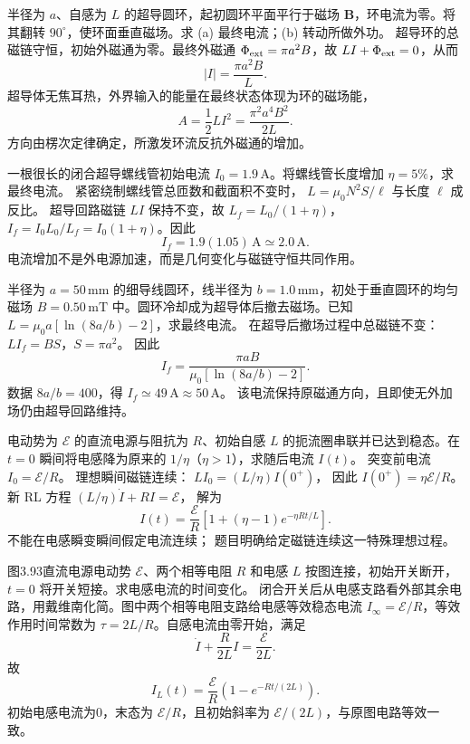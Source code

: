 半径为 $a$、自感为 $L$ 的超导圆环，起初圆环平面平行于磁场 $\bm B$，环电流为零。将其翻转 $90^\circ$，使环面垂直磁场。求 (a) 最终电流；(b) 转动所做外功。
\exsolution
超导环的总磁链守恒，初始外磁通为零。最终外磁通 $\Phi_{\rm ext}=\pi a^2B$，故
$LI+\Phi_{\rm ext}=0$，从而
\[
\boxed{|I|=\frac{\pi a^2B}{L}}.
\]
超导体无焦耳热，外界输入的能量在最终状态体现为环的磁场能，
\[
\boxed{A=\frac12LI^2=\frac{\pi^2a^4B^2}{2L}}.
\]
\excheck 方向由楞次定律确定，所激发环流反抗外磁通的增加。

一根很长的闭合超导螺线管初始电流 $I_0=1.9\,\mathrm A$。将螺线管长度增加 $\eta=5\%$，求最终电流。
\exsolution
紧密绕制螺线管总匝数和截面积不变时，
$L=\mu_0N^2S/\ell$ 与长度 $\ell$ 成反比。
超导回路磁链 $LI$ 保持不变，故
$L_f=L_0/(1+\eta)$，
$I_f=I_0L_0/L_f=I_0(1+\eta)$。因此
\[
\boxed{I_f=1.9(1.05)\,\mathrm A\simeq2.0\,\mathrm A}.
\]
\excheck 电流增加不是外电源加速，而是几何变化与磁链守恒共同作用。

半径为 $a=50\,\mathrm{mm}$ 的细导线圆环，线半径为 $b=1.0\,\mathrm{mm}$，初处于垂直圆环的均匀磁场 $B=0.50\,\mathrm{mT}$ 中。圆环冷却成为超导体后撤去磁场。已知
$L=\mu_0a[\ln(8a/b)-2]$，求最终电流。
\exsolution
在超导后撤场过程中总磁链不变：
$LI_f=BS$，$S=\pi a^2$。
因此
\[
\boxed{I_f=
\frac{\pi aB}{\mu_0[\ln(8a/b)-2]}}.
\]
数据 $8a/b=400$，得
$\boxed{I_f\simeq49\,\mathrm A\approx50\,\mathrm A}$。
\excheck 该电流保持原磁通方向，且即使无外加场仍由超导回路维持。

电动势为 $\mathcal E$ 的直流电源与阻抗为 $R$、初始自感 $L$ 的扼流圈串联并已达到稳态。在 $t=0$ 瞬间将电感降为原来的 $1/\eta$（$\eta>1$），求随后电流 $I(t)$。
\exsolution
突变前电流 $I_0=\mathcal E/R$。
理想瞬间磁链连续：
$LI_0=(L/\eta)I(0^+)$，
因此 $I(0^+)=\eta\mathcal E/R$。
新 RL 方程
$(L/\eta)\dot I+RI=\mathcal E$，
解为
\[
\boxed{I(t)=\frac{\mathcal E}{R}
\left[1+(\eta-1)e^{-\eta Rt/L}\right]}.
\]
\excheck 不能在电感瞬变瞬间假定电流连续；
题目明确给定磁链连续这一特殊理想过程。

图3.93直流电源电动势 $\mathcal E$、两个相等电阻 $R$ 和电感 $L$ 按图连接，初始开关断开，$t=0$ 将开关短接。求电感电流的时间变化。
\exsolution
闭合开关后从电感支路看外部其余电路，用戴维南化简。图中两个相等电阻支路给电感等效稳态电流
$I_\infty=\mathcal E/R$，等效作用时间常数为 $\tau=2L/R$。自感电流由零开始，满足
\[
\dot I+\frac{R}{2L}I=\frac{\mathcal E}{2L}.
\]
故
\[
\boxed{I_L(t)=\frac{\mathcal E}{R}
\left(1-e^{-Rt/(2L)}\right)}.
\]
\excheck 初始电感电流为0，末态为 $\mathcal E/R$，且初始斜率为 $\mathcal E/(2L)$，与原图电路等效一致。

